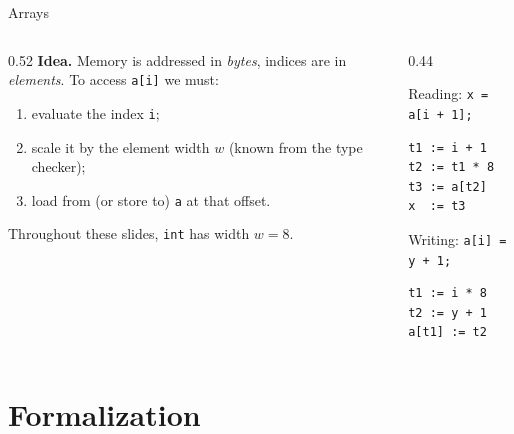 \documentclass[aspectratio=169,11pt,xcolor=table]{beamer}
\newcommand{\tc}[1]{\texttt{#1}}
\begin{document}
\begin{frame}[fragile]{Arrays}
  \begin{columns}[T]
    \begin{column}{0.52\textwidth}
      \textbf{Idea.} Memory is addressed in \emph{bytes}, indices are in
      \emph{elements}. To access \tc{a[i]} we must:
      \begin{enumerate}
        \item evaluate the index \tc{i};
        \item scale it by the element width $w$ (known from the type checker);
        \item load from (or store to) \tc{a} at that offset.
      \end{enumerate}
      Throughout these slides, \tc{int} has width $w = 8$.
    \end{column}
    \begin{column}{0.44\textwidth}
      \begin{block}{Reading: \tc{x = a[i + 1];}}
        \begin{verbatim}
t1 := i + 1
t2 := t1 * 8
t3 := a[t2]
x  := t3
        \end{verbatim}
      \end{block}
      \begin{block}{Writing: \tc{a[i] = y + 1;}}
        \begin{verbatim}
t1 := i * 8
t2 := y + 1
a[t1] := t2
        \end{verbatim}
      \end{block}
    \end{column}
  \end{columns}
\end{frame}



\section{Formalization}
\end{document}
